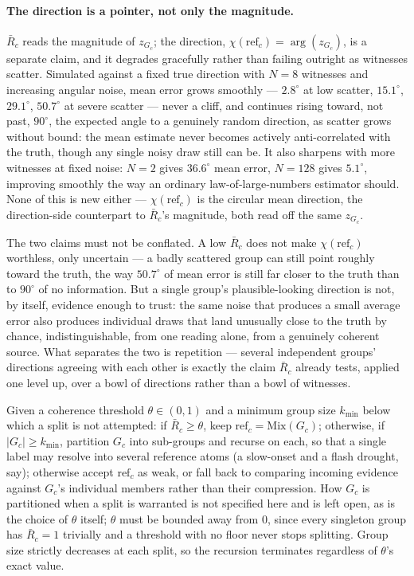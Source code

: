 \documentclass[12pt, a4paper]{article}
\begin{document}
\paragraph{The direction is a pointer, not only the magnitude.}
\label{par:direction_pointer}
$\bar R_c$ reads the magnitude of $z_{G_c}$; the direction,
$\chi(\mathrm{ref}_c)=\arg(z_{G_c})$, is a separate claim, and it
degrades gracefully rather than failing outright as witnesses
scatter. Simulated against a fixed true direction with $N=8$
witnesses and increasing angular noise, mean error grows smoothly
--- $2.8^\circ$ at low scatter, $15.1^\circ$, $29.1^\circ$,
$50.7^\circ$ at severe scatter --- never a cliff, and continues
rising toward, not past, $90^\circ$, the expected angle to a
genuinely random direction, as scatter grows without bound: the mean
estimate never becomes actively anti-correlated with the truth,
though any single noisy draw still can be. It also sharpens with
more witnesses at fixed noise: $N=2$ gives $36.6^\circ$ mean error,
$N=128$ gives $5.1^\circ$, improving smoothly the way an ordinary
law-of-large-numbers estimator should. None of this is new either
--- $\chi(\mathrm{ref}_c)$ is the circular mean direction, the
direction-side counterpart to $\bar R_c$'s magnitude, both read off
the same $z_{G_c}$.

The two claims must not be conflated. A low $\bar R_c$ does not make
$\chi(\mathrm{ref}_c)$ worthless, only uncertain --- a badly
scattered group can still point roughly toward the truth, the way
$50.7^\circ$ of mean error is still far closer to the truth than to
$90^\circ$ of no information. But a single group's plausible-looking
direction is not, by itself, evidence enough to trust: the same
noise that produces a small average error also produces individual
draws that land unusually close to the truth by chance,
indistinguishable, from one reading alone, from a genuinely coherent
source. What separates the two is repetition --- several independent
groups' directions agreeing with each other is exactly the claim
$\bar R_c$ already tests, applied one level up, over a bowl of
directions rather than a bowl of witnesses.

Given a coherence threshold $\theta\in(0,1)$ and a minimum
group size $k_{\min}$ below which a split is not attempted: if
$\bar R_c\ge\theta$, keep $\mathrm{ref}_c=\mathrm{Mix}(G_c)$; otherwise, if
$|G_c|\ge k_{\min}$, partition $G_c$ into sub-groups and recurse on
each, so that a single label may resolve into several reference atoms
(a slow-onset and a flash drought, say); otherwise accept
$\mathrm{ref}_c$ as weak, or fall back to comparing incoming evidence
against $G_c$'s individual members rather than their compression. How
$G_c$ is partitioned when a split is warranted is not specified here
and is left open, as is the choice of $\theta$ itself; $\theta$ must
be bounded away from $0$, since every singleton group has $\bar
R_c=1$ trivially and a threshold with no floor never stops splitting.
Group size strictly decreases at each split, so the recursion
terminates regardless of $\theta$'s exact value.
\end{document}
